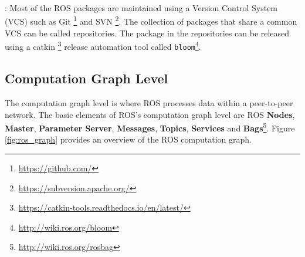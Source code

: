 \begin{description}[leftmargin=0in, labelindent=0pt]
{%
%
%
}  

\item[Repositories]: {Most of the ROS packages are maintained using a Version Control System (VCS) such as Git \footnote{\url{https://github.com/}} and SVN \footnote{\url{https://subversion.apache.org/}}. The collection of packages that share a common VCS can be called repositories. The package in the repositories can be released using a catkin \footnote{\url{https://catkin-tools.readthedocs.io/en/latest/}} release automation tool called \texttt{bloom}\footnote{\url{http://wiki.ros.org/bloom}}.
}
\end{description}


\subsection{Computation Graph Level}
\label{ros:computaion_graph}
The computation graph level is where ROS processes data within a peer-to-peer network. The basic elements of ROS’s computation graph level are ROS \textbf{Nodes}, \textbf{Master}, \textbf{Parameter Server}, \textbf{Messages}, \textbf{Topics}, \textbf{Services} and \textbf{Bags}\footnote{\url{http://wiki.ros.org/rosbag}}. Figure \ref{fig:ros_graph} provides an overview of the ROS computation graph. 

